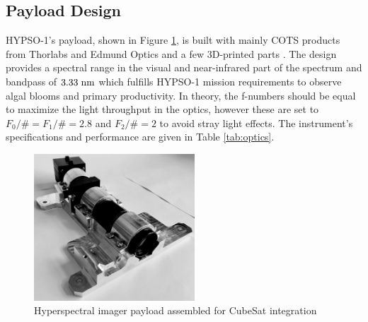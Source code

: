 \subsection{Payload Design} \label{sec:payload-hsi}
HYPSO-1's payload, shown in Figure \ref{fig:HSI}, is built with mainly COTS products from Thorlabs and Edmund Optics and a few 3D-printed parts \cite{Sigernes18}. The design provides a spectral range in the visual and near-infrared part of the spectrum and bandpass of $3.33 \hspace{3pt} \rm{nm}$ which fulfills HYPSO-1 mission requirements to observe algal blooms and primary productivity. In theory, the f-numbers should be equal to maximize the light throughput in the optics, however these are set to $F_0/\#=F_1/\#=2.8$ and $F_2/\#=2$ to avoid stray light effects. The instrument's specifications and performance are given in Table \ref{tab:optics}.
\begin{figure}[tbhp]
  \begin{center}
    \includegraphics[width=60mm,angle=0]{figs/HSI.jpg}  %
    \caption{Hyperspectral imager payload assembled for CubeSat integration}
    \label{fig:HSI}
\end{center}
\end{figure}


